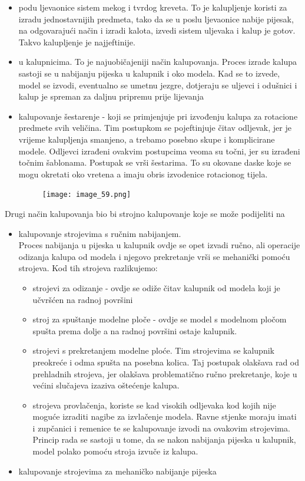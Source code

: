 \documentclass[a4paper,12pt]{article}
\numberwithin{figure}{section}
\begin{document}
\begin{itemize}
\item podu ljevaonice sistem mekog i tvrdog kreveta. To je kalupljenje koristi za izradu jednostavnijih predmeta, tako da se u poslu ljevaonice nabije pijesak, na odgovarajući način i izradi kalota, izvedi sistem uljevaka i kalup je gotov. Takvo kalupljenje je najjeftinije.
\item u kalupnicima. To je najuobičajeniji način kalupovanja. Proces izrade kalupa sastoji se u nabijanju pijeska u kalupnik i oko modela. Kad se to izvede, model se izvodi, eventualno se umetnu jezgre, dotjeraju se uljevci i odušnici i kalup je spreman za daljnu pripremu prije lijevanja
\item kalupovanje šestarenje - koji se primjenjuje pri izvođenju kalupa za rotacione predmete svih veličina. Tim postupkom se pojeftinjuje čitav odljevak, jer je vrijeme kalupljenja smanjeno, a trebamo posebno skupe i komplicirane modele. Odljevci izrađeni ovakvim postupcima veoma su točni, jer su izrađeni točnim šablonama. Postupak se vrši šestarima. To su okovane daske koje se mogu okretati oko vretena a imaju obris izvodenice rotacionog tijela.
\begin{figure}[!h]
\centering
\texttt{[image: image\_59.png]}
\end{figure}
\FloatBarrier
\end{itemize}
Drugi način kalupovanja bio bi strojno kalupovanje koje se može podijeliti na
\begin{itemize}
\item kalupovanje strojevima s ručnim nabijanjem.\\
Proces nabijanja u pijeska u kalupnik ovdje se opet izvadi ručno, ali operacije odizanja kalupa od modela i njegovo prekretanje vrši se mehanički pomoću strojeva. Kod tih strojeva razlikujemo:
\begin{itemize}
\item strojevi za odizanje - ovdje se odiže čitav kalupnik od modela koji je učvršćen na radnoj površini
\item stroj za spuštanje modelne ploče - ovdje se model s modelnom pločom spušta prema dolje a na radnoj površini ostaje kalupnik.
\item strojevi s prekretanjem modelne ploće. Tim strojevima se kalupnik preokreće i odma spušta na posebna kolica. Taj postupak olakšava rad od prehladnih strojeva, jer olakšava problematično ručno prekretanje, koje u većini slučajeva izaziva oštećenje kalupa.
\item strojeva provlačenja, koriste se kad visokih odljevaka kod kojih nije moguće izraditi nagibe za izvlačenje modela. Ravne stjenke moraju imati i zupčanici i remenice te se kalupovanje izvodi na ovakovim strojevima. Princip rada se sastoji u tome, da se nakon nabijanja pijeska u kalupnik, model polako pomoću stroja izvuče iz kalupa.
\end{itemize}
\item kalupovanje strojevima za mehaničko nabijanje pijeska
\end{itemize}
\end{document}
